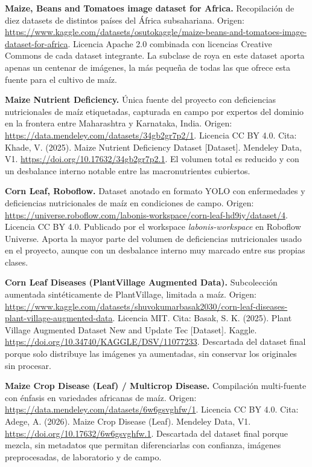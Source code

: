 \documentclass[12pt,letterpaper]{article}
\begin{document}
\textbf{Maize, Beans and Tomatoes image dataset for Africa.} Recopilaci\'on de diez datasets de distintos pa\'ises del \'Africa subsahariana. Origen: \url{https://www.kaggle.com/datasets/osutokaggle/maize-beans-and-tomatoes-image-dataset-for-africa}. Licencia Apache 2.0 combinada con licencias Creative Commons de cada dataset integrante. La subclase de roya en este dataset aporta apenas un centenar de im\'agenes, la m\'as peque\~na de todas las que ofrece esta fuente para el cultivo de ma\'iz.

\textbf{Maize Nutrient Deficiency.} \'Unica fuente del proyecto con deficiencias nutricionales de ma\'iz etiquetadas, capturada en campo por expertos del dominio en la frontera entre Maharashtra y Karnataka, India. Origen: \url{https://data.mendeley.com/datasets/34gb2gr7p2/1}. Licencia CC BY 4.0. Cita: Khade, V. (2025). Maize Nutrient Deficiency Dataset [Dataset]. Mendeley Data, V1. \url{https://doi.org/10.17632/34gb2gr7p2.1}. El volumen total es reducido y con un desbalance interno notable entre las macronutrientes cubiertos.

\textbf{Corn Leaf, Roboflow.} Dataset anotado en formato YOLO con enfermedades y deficiencias nutricionales de ma\'iz en condiciones de campo. Origen: \url{https://universe.roboflow.com/labonis-workspace/corn-leaf-hd9iy/dataset/4}. Licencia CC BY 4.0. Publicado por el workspace \textit{labonis-workspace} en Roboflow Universe. Aporta la mayor parte del volumen de deficiencias nutricionales usado en el proyecto, aunque con un desbalance interno muy marcado entre sus propias clases.

\textbf{Corn Leaf Diseases (PlantVillage Augmented Data).} Subcolecci\'on aumentada sint\'eticamente de PlantVillage, limitada a ma\'iz. Origen: \url{https://www.kaggle.com/datasets/shuvokumarbasak2030/corn-leaf-diseases-plant-village-augmented-data}. Licencia MIT. Cita: Basak, S. K. (2025). Plant Village Augmented Dataset New and Update Tec [Dataset]. Kaggle. \url{https://doi.org/10.34740/KAGGLE/DSV/11077233}. Descartada del dataset final porque solo distribuye las im\'agenes ya aumentadas, sin conservar los originales sin procesar.

\textbf{Maize Crop Disease (Leaf) / Multicrop Disease.} Compilaci\'on multi-fuente con \'enfasis en variedades africanas de ma\'iz. Origen: \url{https://data.mendeley.com/datasets/6w6gsvghfw/1}. Licencia CC BY 4.0. Cita: Adege, A. (2026). Maize Crop Disease (Leaf). Mendeley Data, V1. \url{https://doi.org/10.17632/6w6gsvghfw.1}. Descartada del dataset final porque mezcla, sin metadatos que permitan diferenciarlas con confianza, im\'agenes preprocesadas, de laboratorio y de campo.
\end{document}
